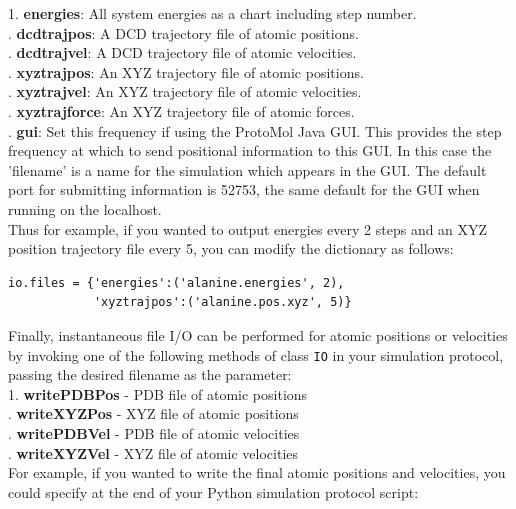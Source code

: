 \documentclass[11pt]{report}
\begin{document}
1. {\bf energies}: All system energies as a chart including step number. \\
. {\bf dcdtrajpos}: A DCD trajectory file of atomic positions. \\
. {\bf dcdtrajvel}: A DCD trajectory file of atomic velocities. \\
. {\bf xyztrajpos}: An XYZ trajectory file of atomic positions. \\
. {\bf xyztrajvel}: An XYZ trajectory file of atomic velocities. \\
. {\bf xyztrajforce}: An XYZ trajectory file of atomic forces. \\
. {\bf gui}: Set this frequency if using the ProtoMol Java GUI.  This
provides the step frequency at which to send positional information to
this GUI.  In this case the 'filename' is a name for the simulation which
appears in the GUI.  The default port for submitting information is 52753,
the same default for the GUI when running on the localhost. \\

Thus for example, if you wanted to output energies every 2 steps
and an XYZ position trajectory file every 5, you can modify the dictionary
as follows:

\begin{verbatim}
io.files = {'energies':('alanine.energies', 2),
            'xyztrajpos':('alanine.pos.xyz', 5)}
\end{verbatim}

Finally, instantaneous file I/O can be performed for atomic positions
or velocities by invoking one of the following methods of class \texttt{IO} in 
your simulation protocol, passing the desired filename as the parameter:\\

1. {\bf writePDBPos} - PDB file of atomic positions\\
. {\bf writeXYZPos} - XYZ file of atomic positions\\
. {\bf writePDBVel} - PDB file of atomic velocities\\
. {\bf writeXYZVel} - XYZ file of atomic velocities\\

For example, if you wanted to write the final atomic positions
and velocities, you could specify at the end of your Python simulation
protocol script:
\end{document}
